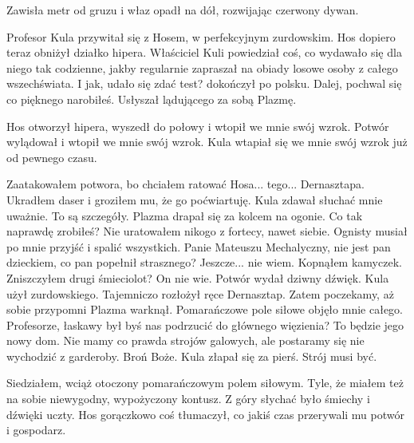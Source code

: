 Zawisła metr od gruzu i właz opadł na dół, rozwijając czerwony dywan.
\begin{dialogue}
\ds{}  \dm{} Profesor Kula przywitał się z Hosem, w perfekcyjnym zurdowskim. \dm{} 
\ds{}  \dm{} Hos dopiero teraz obniżył działko hipera.
\ds{}  \dm{} 
Właściciel Kuli powiedział coś, co wydawało się dla niego tak codzienne, jakby regularnie zapraszał na obiady losowe osoby z całego wszechświata. \dm{} 
I jak, udało się zdać test? \dm{} dokończył po polsku.
\ds{} Dalej, pochwal się co pięknego narobiłeś. \dm{} Usłyszał lądującego za sobą Plazmę. \dm{} 
\end{dialogue}

Hos otworzył hipera, wyszedł do połowy i wtopił we mnie swój wzrok.
Potwór wylądował i wtopił we mnie swój wzrok.
Kula wtapiał się we mnie swój wzrok już od pewnego czasu.

\begin{dialogue}
\ds{} Zaatakowałem potwora, bo chciałem ratować Hosa... tego... Dernasztapa. Ukradłem daser i groziłem mu, że go poćwiartuję. \dm{} Kula zdawał słuchać mnie uważnie.
\ds{} To są szczegóły. \dm{} Plazma drapał się za kolcem na ogonie. \dm{} Co tak naprawdę zrobiłeś?
\ds{} Nie uratowałem nikogo z fortecy, nawet siebie. Ognisty musiał po mnie przyjść i spalić wszystkich.
\ds{} Panie Mateuszu Mechalyczny, nie jest pan dzieckiem, co pan popełnił strasznego?
\ds{} Jeszcze... nie wiem. \dm{} Kopnąłem kamyczek. \dm{} Zniszczyłem drugi śmieciolot?
\ds{} On nie wie. \dm{} Potwór wydał dziwny dźwięk.
\ds{}  \dm{} Kula użył zurdowskiego.
\ds{}  \dm{} Tajemniczo rozłożył ręce Dernasztap.
\ds{} Zatem poczekamy, aż sobie przypomni \dm{} Plazma warknął. Pomarańczowe pole siłowe objęło mnie całego. \dm{} 
Profesorze, łaskawy był byś nas podrzucić do głównego więzienia? To będzie jego nowy dom.
Nie mamy co prawda strojów galowych, ale postaramy się nie wychodzić z garderoby.
\ds{} Broń Boże. \dm{} Kula złapał się za pierś. \dm{} Strój musi być.
\end{dialogue}

Siedziałem, wciąż otoczony pomarańczowym polem siłowym. Tyle, że miałem też na sobie niewygodny, wypożyczony kontusz.
Z góry słychać było śmiechy i dźwięki uczty.
Hos gorączkowo coś tłumaczył, co jakiś czas przerywali mu potwór i gospodarz.

